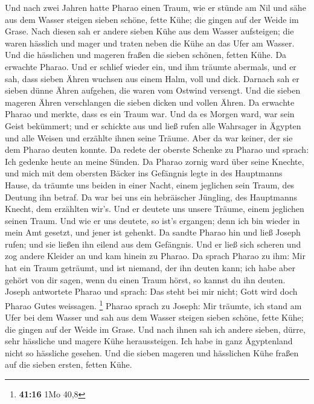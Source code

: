  Und nach zwei Jahren hatte Pharao einen Traum, wie er
stünde am Nil  und sähe aus dem Wasser steigen sieben
schöne, fette Kühe; die gingen auf der Weide im Grase.  Nach
diesen sah er andere sieben Kühe aus dem Wasser aufsteigen; die waren
hässlich und mager und traten neben die Kühe an das Ufer am Wasser.
 Und die hässlichen und mageren fraßen die sieben schönen,
fetten Kühe. Da erwachte Pharao.  Und er schlief wieder ein,
und ihm träumte abermals, und er sah, dass sieben Ähren wuchsen aus
einem Halm, voll und dick.  Darnach sah er sieben dünne
Ähren aufgehen, die waren vom Ostwind versengt.  Und die
sieben mageren Ähren verschlangen die sieben dicken und vollen Ähren. Da
erwachte Pharao und merkte, dass es ein Traum war.  Und da
es Morgen ward, war sein Geist bekümmert; und er schickte aus und ließ
rufen alle Wahrsager in Ägypten und alle Weisen und erzählte ihnen seine
Träume. Aber da war keiner, der sie dem Pharao deuten konnte.
 Da redete der oberste Schenke zu Pharao und sprach: Ich
gedenke heute an meine Sünden.  Da Pharao zornig ward über
seine Knechte, und mich mit dem obersten Bäcker ins Gefängnis legte in
des Hauptmanns Hause,  da träumte uns beiden in einer
Nacht, einem jeglichen sein Traum, des Deutung ihn betraf. 
Da war bei uns ein hebräischer Jüngling, des Hauptmanns Knecht, dem
erzählten wir's. Und er deutete uns unsere Träume, einem jeglichen
seinen Traum.  Und wie er uns deutete, so ist's ergangen;
denn ich bin wieder in mein Amt gesetzt, und jener ist gehenkt.
 Da sandte Pharao hin und ließ Joseph rufen; und sie ließen
ihn eilend aus dem Gefängnis. Und er ließ sich scheren und zog andere
Kleider an und kam hinein zu Pharao.  Da sprach Pharao zu
ihm: Mir hat ein Traum geträumt, und ist niemand, der ihn deuten kann;
ich habe aber gehört von dir sagen, wenn du einen Traum hörst, so kannst
du ihn deuten.  Joseph antwortete Pharao und sprach: Das
steht bei mir nicht; Gott wird doch Pharao Gutes weissagen. \footnote{\textbf{41:16}
  1Mo 40,8}  Pharao sprach zu Joseph: Mir träumte, ich
stand am Ufer bei dem Wasser  und sah aus dem Wasser
steigen sieben schöne, fette Kühe; die gingen auf der Weide im Grase.
 Und nach ihnen sah ich andere sieben, dürre, sehr
hässliche und magere Kühe heraussteigen. Ich habe in ganz Ägyptenland
nicht so hässliche gesehen.  Und die sieben mageren und
hässlichen Kühe fraßen auf die sieben ersten, fetten Kühe. 
